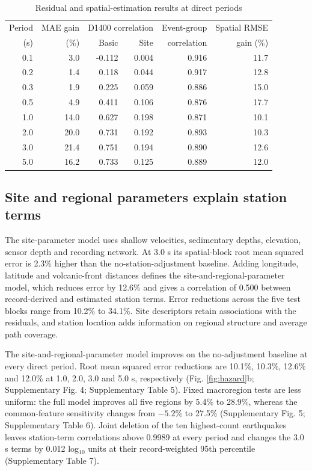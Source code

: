 \documentclass[11pt]{article}
\begin{document}
\begin{table}[!htbp]
\centering
\caption{Residual and spatial-estimation results at direct periods}
\label{tab:periods}
\small
\begin{tabular}{rrrrrr}
\toprule
Period & MAE gain & \multicolumn{2}{c}{D1400 correlation} & Event-group & Spatial RMSE \\
(s) & (\%) & Basic & Site & correlation & gain (\%) \\
\midrule
0.1 & 3.0 & -0.112 & 0.004 & 0.916 & 11.7 \\
0.2 & 1.4 & 0.118 & 0.044 & 0.917 & 12.8 \\
0.3 & 1.9 & 0.225 & 0.059 & 0.886 & 15.0 \\
0.5 & 4.9 & 0.411 & 0.106 & 0.876 & 17.7 \\
1.0 & 14.0 & 0.627 & 0.198 & 0.871 & 10.1 \\
2.0 & 20.0 & 0.731 & 0.192 & 0.893 & 10.3 \\
3.0 & 21.4 & 0.751 & 0.194 & 0.890 & 12.6 \\
5.0 & 16.2 & 0.733 & 0.125 & 0.889 & 12.0 \\
\bottomrule
\end{tabular}
\end{table}

\subsection{Site and regional parameters explain station terms}

The site-parameter model uses shallow velocities, sedimentary depths, elevation, sensor depth and recording network. At 3.0 s its spatial-block root mean squared error is 2.3\% higher than the no-station-adjustment baseline. Adding longitude, latitude and volcanic-front distances defines the site-and-regional-parameter model, which reduces error by 12.6\% and gives a correlation of 0.500 between record-derived and estimated station terms. Error reductions across the five test blocks range from 10.2\% to 34.1\%. Site descriptors retain associations with the residuals, and station location adds information on regional structure and average path coverage.

The site-and-regional-parameter model improves on the no-adjustment baseline at every direct period. Root mean squared error reductions are 10.1\%, 10.3\%, 12.6\% and 12.0\% at 1.0, 2.0, 3.0 and 5.0 s, respectively (Fig. \ref{fig:hazard}b; Supplementary Fig. 4; Supplementary Table 5). Fixed macroregion tests are less uniform: the full model improves all five regions by 5.4\% to 28.9\%, whereas the common-feature sensitivity changes from $-5.2\%$ to 27.5\% (Supplementary Fig. 5; Supplementary Table 6). Joint deletion of the ten highest-count earthquakes leaves station-term correlations above 0.9989 at every period and changes the 3.0 s terms by 0.012 log$_{10}$ units at their record-weighted 95th percentile (Supplementary Table 7).
\end{document}
